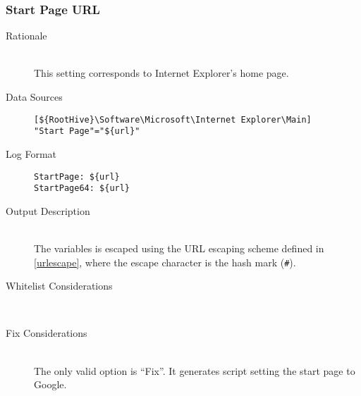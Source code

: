 \subsubsection{Start Page URL}
\begin{description}
\item[Rationale]  \hfill \\ This setting corresponds to Internet Explorer's home
page.

\item[Data Sources] \hfill
\vspace{-\baselineskip}
\begin{verbatim}
[${RootHive}\Software\Microsoft\Internet Explorer\Main]
"Start Page"="${url}"
\end{verbatim}
\item[Log Format] \hfill
\vspace{-\baselineskip}
\begin{verbatim} 
StartPage: ${url}
StartPage64: ${url}
\end{verbatim}
\item[Output Description] \hfill \\
The variables  is escaped using the URL escaping
scheme defined in \ref{urlescape}, where the escape character is the hash mark
(\verb|#|).
\item[Whitelist Considerations] \hfill \\

\item[Fix Considerations] \hfill \\
The only valid option is ``Fix''. It generates script setting the start page to
Google.
\end{description}

